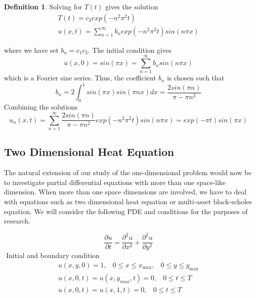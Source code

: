 \documentclass[12pt, oneside]{book}
\theoremstyle{plain}
\theoremstyle{definition}
\newtheorem{definition}[theorem]{Definition}
\begin{document}
\begin{definition}
Solving for $T(t)$ gives the solution
\begin{eqnarray}
T(t) = c_3 exp(-n^2 \pi ^2 t) \\[10pt]
u(x,t) = \sum_{n=1}^{\infty} b_n exp(-n^2 \pi ^2 t) sin(n \pi x)
\end{eqnarray}

where we have set $b_n = c_1 c_3$. The initial condition gives
\begin{equation}
u(x,0) = sin(\pi x) = \sum_{n=1}^{\infty} b_n sin(n \pi x)
\end{equation}
which is a Fourier sine series. Thus, the coefficient $b_n$ is chosen such that
\begin{equation}
b_n = 2 \int_{0}^{1} sin(\pi x) sin(\pi n x) dx = \frac{2sin(\pi n)}{\pi - \pi n^2}
\end{equation}
Combining the solutions
\begin{equation}
u_n(x,t) = \sum_{n=1}^{\infty} \frac{2sin(\pi n)}{\pi - \pi n^2} exp(-n^2 \pi ^2 t) sin(n \pi x)= exp(-\pi t) sin(\pi x)
\end{equation}
\end{definition}

\subsection{Two Dimensional Heat Equation}
The natural extension of our study of the one-dimensional problem would now be to investigate partial differential equations with more than one space-like dimension. When more than one space dimensions are involved, we have to deal with equations such as two dimensional heat equation or multi-asset black-scholes equation.  We will consider the following PDE and conditions for the purposes of research.

\begin{equation}
\frac{\partial u}{\partial t} = \frac{\partial^2 u}{\partial x^2} +\frac{\partial^2 u}{\partial y^2}
\end{equation}$  $
Initial and boundary condition
\begin{eqnarray}
u(x,y,0) = 1, \hspace{10pt} 0 \leq x \leq x_{\max}, \hspace{10pt} 0 \leq y \leq y_{\max} \\[10pt]
u(x, 0, t) = u(x, y_{max}, t) = 0, \hspace{10pt} 0 \leq t \leq T \\[10pt]
u(x, 0, t) = u(x, 1, t) = 0 , \hspace{10pt} 0 \leq t \leq T
\end{eqnarray}
\end{document}
